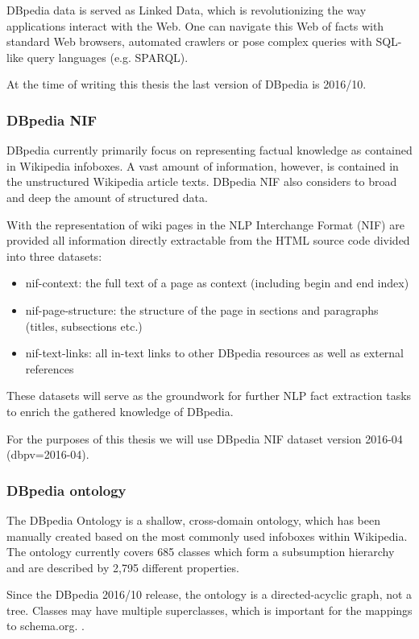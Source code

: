\documentclass[thesis=M,english]{FITthesis}[2018/05/30]
\begin{document}
	DBpedia data is served as Linked Data, which is revolutionizing the way applications interact with the Web. One can navigate this Web of facts with standard Web browsers, automated crawlers or pose complex queries with SQL-like query languages (e.g. SPARQL).

	At the time of writing this thesis the last version of DBpedia is 2016/10.
	
\subsubsection{DBpedia NIF}\label{DBpediaNIF}
	DBpedia \cite{dbpedia:NIF} currently primarily focus on representing factual knowledge as contained in Wikipedia infoboxes. A vast amount of information, however, is contained in the unstructured Wikipedia article texts. DBpedia NIF also considers to broad and deep the amount of structured data.


	With the representation of wiki pages in the NLP Interchange Format (NIF) are provided all information directly extractable from the HTML source code divided into three datasets:
	\begin{itemize}
		\item nif-context: the full text of a page as context (including begin and end index)
		\item nif-page-structure: the structure of the page in sections and paragraphs (titles, subsections etc.)
		\item nif-text-links: all in-text links to other DBpedia resources as well as external references
	\end{itemize}
	These datasets will serve as the groundwork for further NLP fact extraction tasks to enrich the gathered knowledge of DBpedia.

For the purposes of this thesis we will use DBpedia NIF dataset version 2016-04 (dbpv=2016-04).

\subsubsection{DBpedia ontology}\label{DBpediaOntology}
	The DBpedia Ontology is a shallow, cross-domain ontology, which has been manually created based on the most commonly used infoboxes within Wikipedia. The ontology currently covers 685 classes which form a subsumption hierarchy and are described by 2,795 different properties.

	Since the DBpedia 2016/10 release, the ontology is a directed-acyclic graph, not a tree. Classes may have multiple superclasses, which is important for the mappings to schema.org. \cite{dbpedia:Ontology}. 
\end{document}
